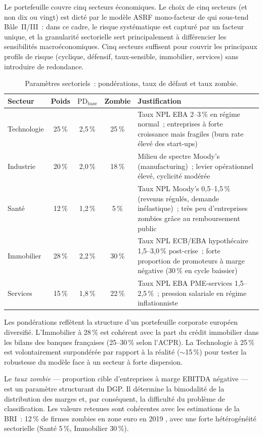 \documentclass[12pt, a4paper, twoside, openright]{report}
\theoremstyle{definition}
\begin{document}
Le portefeuille couvre cinq secteurs économiques.
Le choix de cinq secteurs (et non dix ou vingt) est dicté par le modèle ASRF mono-facteur de \citet{gordy2003} qui sous-tend Bâle~II/III~: dans ce cadre, le risque systématique est capturé par un facteur unique, et la granularité sectorielle sert principalement à différencier les sensibilités macroéconomiques.
Cinq secteurs suffisent pour couvrir les principaux profils de risque (cyclique, défensif, taux-sensible, immobilier, services) sans introduire de redondance.

\begin{table}[htbp]
\centering
\caption{Paramètres sectoriels~: pondérations, taux de défaut et taux zombie.}
\label{tab:secteurs}
\begin{tabular}{lcccp{5cm}}
\toprule
Secteur & Poids & $\text{PD}_{\text{base}}$ & Zombie & Justification \\
\midrule
Technologie   & 25\,\% & 2{,}5\,\% & 25\,\% & Taux NPL EBA 2--3\,\% en régime normal~; entreprises à forte croissance mais fragiles (burn rate élevé des start-ups) \\
Industrie     & 20\,\% & 2{,}0\,\% & 18\,\% & Milieu de spectre Moody's (manufacturing)~; levier opérationnel élevé, cyclicité modérée \\
Santé         & 12\,\% & 1{,}2\,\% &  5\,\% & Taux NPL Moody's 0{,}5--1{,}5\,\% (revenus régulés, demande inélastique)~; très peu d'entreprises zombies grâce au remboursement public \\
Immobilier    & 28\,\% & 2{,}2\,\% & 30\,\% & Taux NPL ECB/EBA hypothécaire 1{,}5--3{,}0\,\% post-crise~; forte proportion de promoteurs à marge négative (30\,\% en cycle baissier) \\
Services      & 15\,\% & 1{,}8\,\% & 22\,\% & Taux NPL EBA PME-services 1{,}5--2{,}5\,\%~; pression salariale en régime inflationniste \\
\bottomrule
\end{tabular}
\end{table}

Les pondérations reflètent la structure d'un portefeuille corporate européen diversifié.
L'Immobilier à 28\,\% est cohérent avec la part du crédit immobilier dans les bilans des banques françaises (25--30\,\% selon l'ACPR).
La Technologie à 25\,\% est volontairement surpondérée par rapport à la réalité ($\sim$15\,\%) pour tester la robustesse du modèle face à un secteur à forte dispersion.

Le \emph{taux zombie} --- proportion cible d'entreprises à marge EBITDA négative --- est un paramètre structurant du DGP.
Il détermine la bimodalité de la distribution des marges et, par conséquent, la difficulté du problème de classification.
Les valeurs retenues sont cohérentes avec les estimations de la BRI~: 12\,\% de firmes zombies en zone euro en 2019 \citep{bcbs_d424}, avec une forte hétérogénéité sectorielle (Santé 5\,\%, Immobilier 30\,\%).
\end{document}
